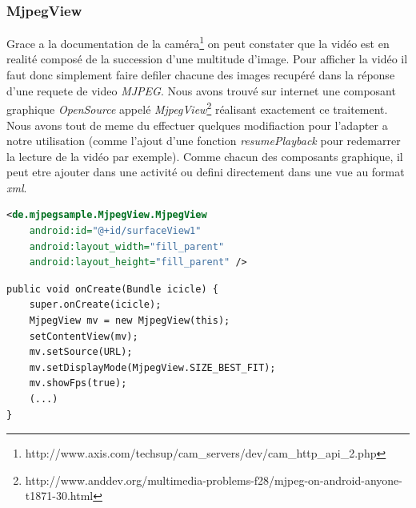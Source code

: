 \subsubsection{MjpegView}
Grace a la documentation de la caméra\footnote{\label{docAxis}
http://www.axis.com/techsup/cam\_servers/dev/cam\_http\_api\_2.php} on peut
constater que la vidéo est en realité composé de la succession d'une multitude
d'image. Pour afficher la vidéo il faut donc simplement faire defiler chacune
des images recupéré dans la réponse d'une requete de video \textit{MJPEG}.
\newline
Nous avons trouvé sur internet une composant graphique \textit{OpenSource}
appelé \textit{MjpegView}\footnote{\label{MjpegView}
http://www.anddev.org/multimedia-problems-f28/mjpeg-on-android-anyone-t1871-30.html}
réalisant exactement ce traitement.
Nous avons tout de meme du effectuer quelques modifiaction pour l'adapter a
notre utilisation (comme l'ajout d'une fonction \textit{resumePlayback} pour
redemarrer la lecture de la vidéo par exemple).\newline
Comme chacun des composants graphique, il peut etre ajouter dans une activité ou
defini directement dans une vue au format \textit{xml}.\newline
\begin{center}
\begin{lstlisting}[language=XML, caption={video.xml}]
<de.mjpegsample.MjpegView.MjpegView
	android:id="@+id/surfaceView1"
	android:layout_width="fill_parent"
	android:layout_height="fill_parent" />
\end{lstlisting}
\end{center}
\begin{center}
\begin{lstlisting}[caption={mjpegViewer.java}] 
public void onCreate(Bundle icicle) {
	super.onCreate(icicle);
	MjpegView mv = new MjpegView(this);
	setContentView(mv);
	mv.setSource(URL);
	mv.setDisplayMode(MjpegView.SIZE_BEST_FIT);
	mv.showFps(true);
	(...)
}
\end{lstlisting}
\end{center}


